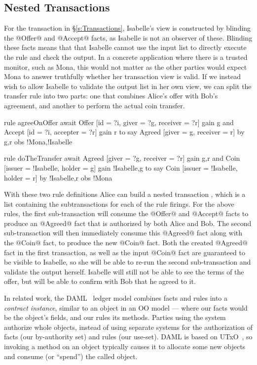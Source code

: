 \subsection{Nested Transactions}
\label{s:NestedTransactions}
For the transaction in \S\ref{s:Transactions}, Isabelle's view is constructed by blinding the @Offer@ and @Accept@ facts, as Isabelle is not an observer of these. Blinding these facts means that that Isabelle cannot use the input list to directly execute the rule and check the output. In a concrete application where there is a trusted monitor, such as Mona, this would not matter as the other parties would expect Mona to answer truthfully whether her transaction view is valid. If we instead wish to allow Isabelle to validate the output list in her own view, we can split the transfer rule into two parts: one that combines Alice's offer with Bob's agreement, and another to perform the actual coin transfer.

\begin{small}
\begin{code}
  rule  agreeOnOffer
  await Offer  [id = ?i, giver = ?g, receiver = ?r] gain {g}
    and Accept [id = ?i, accepter = ?r]             gain {r}
  to
    say Agreed [giver = g, receiver = r]
     by {g,r}  obs {!Mona,!Isabelle}

  rule  doTheTransfer
  await Agreed [giver = ?g, receiver = ?r]        gain {g,r}
   and  Coin   [issuer = !Isabelle, holder = g]
        gain {!Isabelle,g}
  to
    say Coin   [issuer = !Isabelle, holder = r]
     by {!Isabelle,r} obs {!Mona}
\end{code}
\end{small}

With these two rule definitions Alice can build a nested transaction \CITE, which is a list containing the subtransactions for each of the rule firings. For the above rules, the first sub-transaction will consume the @Offer@ and @Accept@ facts to produce an @Agreed@ fact that is authorized by both Alice and Bob. The second sub-transaction will then immediately consume this @Agreed@ fact along with the @Coin@ fact, to produce the new @Coin@ fact. Both the created @Agreed@ fact in the first transaction, as well as the input @Coin@ fact are guaranteed to be visible to Isabelle, so she will be able to re-run the second sub-transaction and validate the output herself. Isabelle will still not be able to see the terms of the offer, but will be able to confirm with Bob that he agreed to it.

In related work, the DAML~\cite{DA2019:DAML} ledger model combines facts and rules into a \emph{contract instance}, similar to an object in an OO model --- where our facts would be the object's fields, and our rules its methods. Parties using the system authorize whole objects, instead of using separate systems for the authorization of facts (our by-authority set) and rules (our use-set). DAML is based on UTxO~\cite{Zahnentferner2018:UTxO}, so invoking a method on an object typically causes it to allocate some new objects and consume (or ``spend'') the called object.

